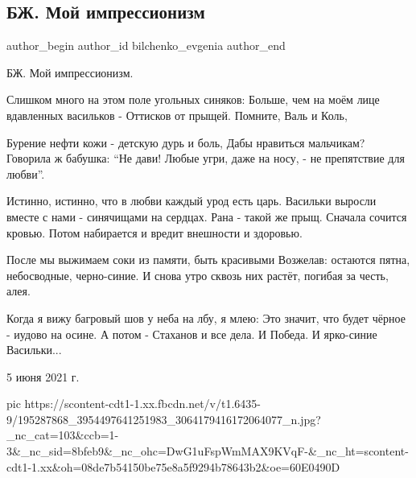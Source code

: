  
 
 
 
 
 
\subsection{БЖ. Мой импрессионизм}
\label{sec:05_06_2021.fb.bilchenko_evgenia.1.impressionizm}
\ifcmt
 author_begin
   author_id bilchenko_evgenia
 author_end
\fi

БЖ. Мой импрессионизм.

Слишком много на этом поле угольных синяков:
Больше, чем на моём лице вдавленных васильков -
Оттисков от прыщей. Помните, Валь и Коль,

Бурение нефти кожи - детскую дурь и боль,
Дабы нравиться мальчикам? Говорила ж бабушка: \enquote{Не дави!
Любые угри, даже на носу, - не препятствие для любви}.

Истинно, истинно, что в любви каждый урод есть царь.
Васильки выросли вместе с нами - синячищами на сердцах.
Рана - такой же прыщ. Сначала сочится кровью.
Потом набирается и вредит внешности и здоровью.

После мы выжимаем соки из памяти, быть красивыми
Возжелав: остаются пятна, небосводные, черно-синие.
И снова утро сквозь них растёт, погибая за честь, алея.

Когда я вижу багровый шов у неба на лбу, я млею:
Это значит, что будет чёрное - иудово на осине.
А потом - Стаханов и все дела. И Победа. И ярко-синие
Васильки...

5 июня 2021 г.

\ifcmt
  pic https://scontent-cdt1-1.xx.fbcdn.net/v/t1.6435-9/195287868_3954497641251983_3064179416172064077_n.jpg?_nc_cat=103&ccb=1-3&_nc_sid=8bfeb9&_nc_ohc=DwG1uFspWmMAX9KVqF-&_nc_ht=scontent-cdt1-1.xx&oh=08de7b54150be75e8a5f9294b78643b2&oe=60E0490D
\fi

